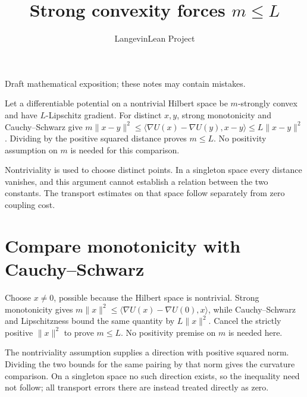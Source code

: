 \documentclass[11pt,a4paper]{article}
\title{\texorpdfstring{Strong convexity forces \(m\le L\)}{Strong convexity forces m≤ L}}
\author{LangevinLean Project}
\date{}
\begin{document}
\maketitle
Draft mathematical exposition; these notes may contain mistakes.


Let a differentiable potential on a nontrivial Hilbert space be \(m\)-strongly convex and have \(L\)-Lipschitz gradient. For distinct \(x,y\), strong monotonicity and Cauchy–Schwarz give \(m\|x-y\|^2\le\langle\nabla U(x)-\nabla U(y),x-y\rangle\le L\|x-y\|^2\). Dividing by the positive squared distance proves \(m\le L\). No positivity assumption on \(m\) is needed for this comparison.



Nontriviality is used to choose distinct points. In a singleton space every distance vanishes, and this argument cannot establish a relation between the two constants. The transport estimates on that space follow separately from zero coupling cost.


\section{\texorpdfstring{Compare monotonicity with Cauchy–Schwarz}{Compare monotonicity with Cauchy–Schwarz}}


Choose \(x\ne0\), possible because the Hilbert space is nontrivial. Strong monotonicity gives \(m\|x\|^2\le\langle\nabla U(x)-\nabla U(0),x\rangle\), while Cauchy–Schwarz and Lipschitzness bound the same quantity by \(L\|x\|^2\). Cancel the strictly positive \(\|x\|^2\) to prove \(m\le L\). No positivity premise on \(m\) is needed here.



The nontriviality assumption supplies a direction with positive squared norm. Dividing the two bounds for the same pairing by that norm gives the curvature comparison. On a singleton space no such direction exists, so the inequality need not follow; all transport errors there are instead treated directly as zero.
\end{document}
